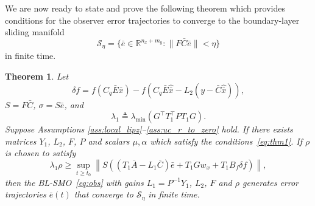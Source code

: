 \documentclass[times, doublespace]{rncauth}
\newcommand{\hb}[1]{\hat{\bar{#1}}}
\newtheorem{theorem}{Theorem}
\begin{document}
We are now ready to state and prove the following theorem which provides conditions for the observer error trajectories to converge to the boundary-layer sliding manifold
\[
\mathcal{S}_\eta = \{\bar e\in\mathbb{R}^{n_x + m_y}: \|F\bar C \bar e\| < \eta \}
\]
in finite time.
\begin{theorem}\label{thm2}
	Let 
	\begin{equation}\label{eq:f_minus_fhat}
	\delta f = f(C_q\bar E \bar x)-f(C_q\bar E\hb x - L_2(y-\bar C\hb x)),
	\end{equation} 
	$S = F\bar C$, $\sigma = S \bar e$, and
	\begin{equation}\label{eq:lambda_1}
	\lambda_1 \triangleq \lambda_{\min}(G^\top T_1^\top P T_1 G).
	\end{equation} Suppose Assumptions \ref{ass:local_lipz}--\ref{ass:uc_r_to_zero} hold. If there exists matrices $Y_1$, $L_2$, $F$, $P$ and scalars $\mu,\alpha$ which satisfy the conditions~\eqref{eq:thm1}. If $\rho$ is chosen to satisfy
	\begin{equation}\label{eq:thm2}
	\lambda_1\rho \ge \sup_{t\ge t_0}\left\|S\left((T_1 \bar A -L_1\bar C) \bar e + T_1G w_x +T_1 B_f \delta f\right)\right\|,
	\end{equation}
	then the BL-SMO~\eqref{eq:obs} with gains $L_1=P^{-1}Y_1$, $L_2$, $F$ and $\rho$ generates error trajectories $\bar e(t)$ that converge to $\mathcal{S}_\eta$ in finite time.
\end{theorem}
\end{document}
